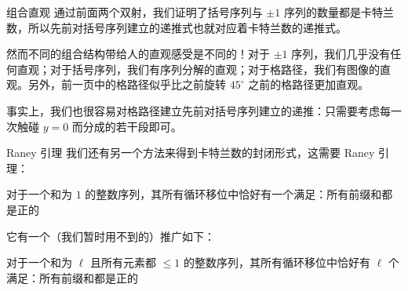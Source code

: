 \begin{frame}{组合直观}
    通过前面两个双射，我们证明了括号序列与 $\pm 1$ 序列的数量都是卡特兰数，所以先前对括号序列建立的递推式也就对应着卡特兰数的递推式。

    然而不同的组合结构带给人的直观感受是不同的！对于 $\pm 1$ 序列，我们几乎没有任何直观；对于括号序列，我们有序列分解的直观；对于格路径，我们有图像的直观。另外，前一页中的格路径似乎比之前旋转 $45^\circ$ 之前的格路径更加直观。
    
    事实上，我们也很容易对格路径建立先前对括号序列建立的递推：只需要考虑每一次触碰 $y=0$ 而分成的若干段即可。
\end{frame}
\begin{frame}{Raney 引理}
    我们还有另一个方法来得到卡特兰数的封闭形式，这需要 Raney 引理：

    \begin{lemma}[Raney 引理]
        对于一个和为 $1$ 的整数序列，其所有循环移位中恰好有一个满足：所有前缀和都是正的
    \end{lemma}
    它有一个（我们暂时用不到的）推广如下：
    \begin{lemma}
        对于一个和为 $\ell$ 且所有元素都 $\le 1$ 的整数序列，其所有循环移位中恰好有 $\ell$ 个满足：所有前缀和都是正的
    \end{lemma}
\end{frame}
